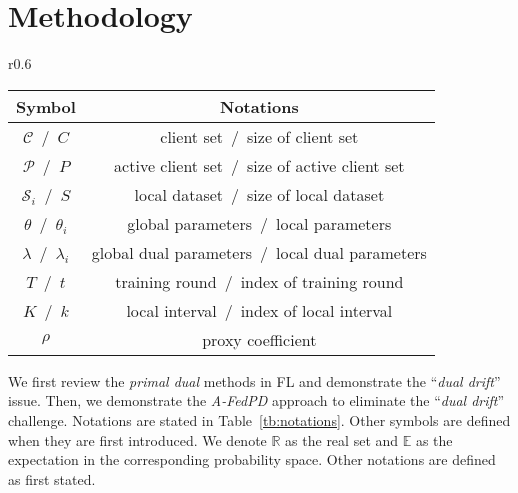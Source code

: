 \section{Methodology}
\label{methodology}

\begin{wraptable}[10]{r}{0.6\linewidth}
\centering
\vspace{-0.85cm}
\caption{Notations adopted in this paper.}
\label{tb:notations}
\begin{tabular}{cc}
\toprule
 Symbol & Notations \\ 
\midrule
 $\mathcal{C}$\ /\ $C$ & client set\ /\ size of client set \\
 $\mathcal{P}$\ /\ $P$ & active client set\ /\ size of active client set \\
 $\mathcal{S}_i$\ /\ $S$ & local dataset\ /\ size of local dataset \\
 $\theta$\ /\ $\theta_i$ & global parameters\ /\ local parameters \\
 $\lambda$\ /\ $\lambda_i$ & global dual parameters\ /\ local dual parameters \\
 $T$\ /\ $t$ & training round\ /\ index of training round\\
 $K$\ /\ $k$ & local interval\ /\ index of local interval\\
 $\rho$ & proxy coefficient \\
\bottomrule
\end{tabular}
\end{wraptable}

We first review the \textit{primal dual} methods in FL and demonstrate the ``\textit{dual drift}'' issue. Then, we demonstrate the \textit{A-FedPD} approach to eliminate the ``\textit{dual drift}'' challenge.
Notations are stated in Table~\ref{tb:notations}. Other symbols are defined when they are first introduced. 
We denote $\mathbb{R}$ as the real set and $\mathbb{E}$ as the expectation in the corresponding probability space. Other notations are defined as first stated.


